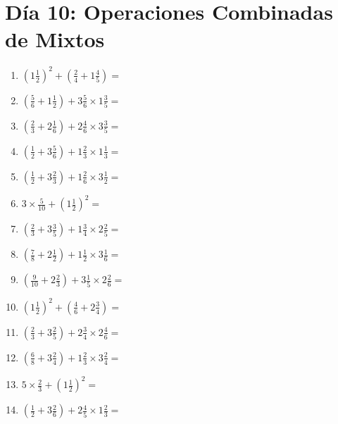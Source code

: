 \documentclass[12pt]{article}
\begin{document}
\section*{Día 10: Operaciones Combinadas de Mixtos}
\begin{enumerate}
\item \large $ (1 \frac{1}{2})^2 + (\frac{2}{4} + 1 \frac{4}{5}) = $ \vspace{1.8cm}
\item \large $ (\frac{5}{6} + 1 \frac{1}{2}) + 3 \frac{5}{6} \times 1 \frac{3}{5} = $ \vspace{1.8cm}
\item \large $ (\frac{2}{3} + 2 \frac{1}{6}) + 2 \frac{4}{6} \times 3 \frac{3}{5} = $ \vspace{1.8cm}
\item \large $ (\frac{1}{2} + 3 \frac{5}{6}) + 1 \frac{2}{3} \times 1 \frac{1}{3} = $ \vspace{1.8cm}
\item \large $ (\frac{1}{2} + 3 \frac{2}{3}) + 1 \frac{2}{6} \times 3 \frac{1}{2} = $ \vspace{1.8cm}
\item \large $ 3 \times \frac{5}{10} + (1 \frac{1}{2})^2 = $ \vspace{1.8cm}
\item \large $ (\frac{2}{3} + 3 \frac{3}{5}) + 1 \frac{3}{4} \times 2 \frac{2}{5} = $ \vspace{1.8cm}
\item \large $ (\frac{7}{8} + 2 \frac{1}{2}) + 1 \frac{1}{2} \times 3 \frac{1}{6} = $ \vspace{1.8cm}
\item \large $ (\frac{9}{10} + 2 \frac{2}{3}) + 3 \frac{1}{5} \times 2 \frac{2}{6} = $ \vspace{1.8cm}
\item \large $ (1 \frac{1}{2})^2 + (\frac{4}{6} + 2 \frac{3}{4}) = $ \vspace{1.8cm}
\newpage
\item \large $ (\frac{2}{3} + 3 \frac{2}{5}) + 2 \frac{3}{4} \times 2 \frac{4}{6} = $ \vspace{1.8cm}
\item \large $ (\frac{6}{8} + 3 \frac{2}{4}) + 1 \frac{2}{3} \times 3 \frac{2}{4} = $ \vspace{1.8cm}
\item \large $ 5 \times \frac{2}{3} + (1 \frac{1}{2})^2 = $ \vspace{1.8cm}
\item \large $ (\frac{1}{2} + 3 \frac{2}{6}) + 2 \frac{4}{5} \times 1 \frac{2}{3} = $ \vspace{1.8cm}

\end{enumerate}
\end{document}
